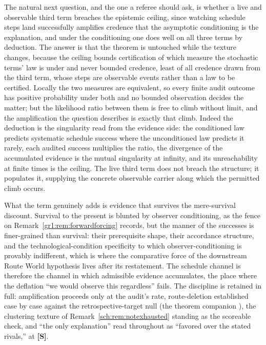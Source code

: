\begin{remark}\label{sch:rem:thirdceiling}
The natural next question, and the one a referee should ask, is
whether a live and observable third term breaches the epistemic
ceiling, since watching schedule steps land successfully amplifies
credence that the asymptotic conditioning is the explanation, and
under the conditioning one does well on all three terms by deduction.
The answer is that the theorem is untouched while the texture
changes, because the ceiling bounds certification of which measure
the stochastic terms' law is under and never bounded credence, least
of all credence drawn from the third term, whose steps are
observable events rather than a law to be certified. Locally the two measures are equivalent, so every finite
audit outcome has positive probability under both and no bounded
observation decides the matter; but the likelihood ratio between
them is free to climb without limit, and the amplification the
question describes is exactly that climb. Indeed the deduction is
the singularity read from the evidence side: the conditioned law
predicts systematic schedule success where the unconditioned law
predicts it rarely, each audited success multiplies the ratio, the
divergence of the accumulated evidence is the mutual singularity at
infinity, and its unreachability at finite times is the ceiling. The
live third term does not breach the structure; it populates it,
supplying the concrete observable carrier along which the permitted
climb occurs.

What the term genuinely adds is evidence that survives the
mere-survival discount. Survival to the present is blunted by
observer conditioning, as the fence on
Remark~\ref{gr1:rem:forwardforcing} records, but the manner of the
successes is finer-grained than survival: their prerequisite shape,
their accordance structure, and the technological-condition
specificity to which observer-conditioning is provably indifferent,
which is where the comparative force of
the downstream Route World hypothesis lives after its restatement. The
schedule channel is therefore the channel in which admissible
evidence accumulates, the place where the deflation ``we would
observe this regardless'' fails. The discipline is retained in full:
amplification proceeds only at the audit's rate, route-deletion
established case by case against the retrospective-target null
(the theorem companion \cite{GoldenTargeted}), the clustering texture of
Remark~\ref{sch:rem:notexhausted} standing as the scoreable check,
and ``the only explanation'' read throughout as ``favored over the
stated rivals,'' at \textbf{[S]}.


\end{remark}
